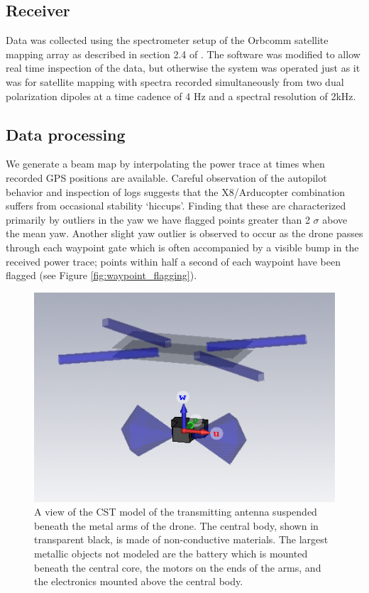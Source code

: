 \documentclass[preprint2,numberedappendix,tighten,twocolappendix]{aastex6}
\begin{document}
\subsection{Receiver}
Data was collected using the spectrometer setup of the Orbcomm satellite mapping array as described in section 2.4 of \citet{2016:NebenHERAdish}. The software was modified to allow real time inspection of the data, but otherwise the system was operated just as it was for satellite mapping with spectra recorded simultaneously from two dual polarization dipoles at a time cadence of 4 Hz and a spectral resolution of 2kHz. 
\subsection{Data processing}
\label{sec:processing}
We generate a beam map by interpolating the power trace at times when recorded GPS positions are available.  Careful observation of the autopilot behavior and inspection of logs suggests that the X8/Arducopter combination suffers from occasional stability `hiccups'. Finding that these are characterized primarily by outliers in the yaw we have flagged points greater than 2 $\sigma$ above the mean yaw.  Another slight yaw outlier is observed to occur as the drone passes through each waypoint gate which is often accompanied by a visible bump in the received power trace; points within half a second of each waypoint have been flagged (see Figure \ref{fig:waypoint_flagging}).

\begin{figure}
\includegraphics[width=\columnwidth]{figures/drone_antenna_screenshot.png}
\caption{A view of the CST model of the transmitting antenna suspended beneath the metal arms of the drone. The central body, shown in transparent black, is made of non-conductive materials. The largest metallic objects not modeled are the battery which is mounted beneath the central core, the motors on the ends of the arms, and the electronics mounted above the central body.}\label{fig:tx_cst}
\end{figure}
\end{document}
